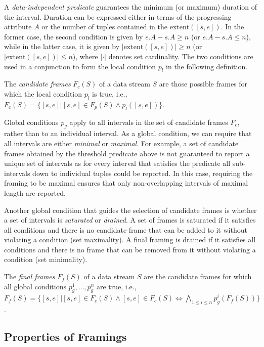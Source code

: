 \documentclass{vldb}
\begin{document}
A \emph{data-independent predicate} guarantees the minimum (or maximum) duration of the interval. Duration can be expressed either in terms of the progressing attribute $A$ or the number of tuples contained in the $\text{extent}([s,e])$. In the former case, the second condition is given by $e.A - s.A \geq n$ (or $e.A - s.A \leq n$), while in the latter case, it is given by $|\text{extent}([s,e])| \geq n$ (or $|\text{extent}([s,e])| \leq n$), where $|\cdot|$ denotes set cardinality. The two conditions are used in a conjunction to form the local condition $p_l$ in the following definition.

\begin{definition}
The \emph{candidate frames} $F_c(S)$ of a data stream $S$ are those possible frames for which the local condition $p_l$ is true, i.e., $F_c(S) = \{[s,e] | [s,e] \in F_p(S) \wedge p_l([s,e]) \}$.
\end{definition}

Global conditions $p_g$ apply to all intervals in the set of candidate frames $F_c$, rather than to an individual interval. As a global condition, we can require that all intervals are either \emph{minimal} or \emph{maximal}. For example, a set of candidate frames obtained by the threshold predicate above is not guaranteed to report a unique set of intervals as for every interval that satisfies the predicate all sub-intervals down to individual tuples could be reported. In this case, requiring the framing to be maximal ensures that only non-overlapping intervals of maximal length are reported.

Another global condition that guides the selection of candidate frames is whether a set of intervals is \emph{saturated} or \emph{drained}. A set of frames is saturated if it satisfies all conditions and there is no candidate frame that can be added to it without violating a condition (set maximality). A final framing is drained if it satisfies all conditions and there is no frame that can be removed from it without violating a condition (set minimality).

\begin{definition}
The \emph{final frames} $F_f(S)$ of a data stream $S$ are the candidate frames for which all global conditions $p_g^1, \ldots, p_g^n$ are true, i.e., $F_f(S) = \{[s,e] | [s,e] \in F_c(S) \wedge [s,e] \in F_c(S) \Leftrightarrow \bigwedge_{1 \leq i \leq n} p_g^i(F_f(S))\}$.
\end{definition}

\subsection{Properties of Framings}
\end{document}
